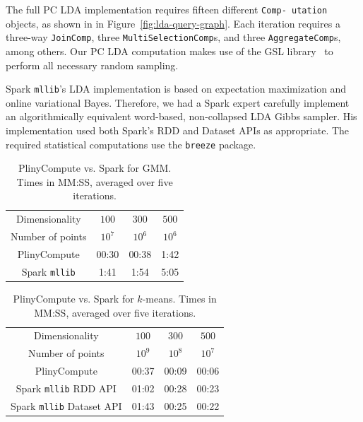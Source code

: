 The full PC LDA implementation requires fifteen different
\texttt{Comp- utation} objects, as shown in 
in Figure~\ref{fig:lda-query-graph}.  Each iteration requires a 
three-way \texttt{JoinComp}, three \texttt{MultiSelectionComp}s, and three
\texttt{AggregateComp}s, among others. 
Our PC LDA computation makes use of the GSL library~\cite{gsl} to perform all necessary random sampling.

Spark \texttt{mllib}'s LDA implementation is based on expectation
maximization and online variational Bayes.
Therefore, we had a Spark expert 
carefully implement an algorithmically
equivalent word-based, non-collapsed LDA Gibbs sampler.  His implementation used both
Spark's RDD and Dataset        
APIs as appropriate.
The required statistical computations use the
\texttt{breeze} package. 


\begin{table}[t]
\small
\begin{center}
\begin{tabular}{|c||c|c|c|}
\hline
Dimensionality & $100$ & $300$ & $500$ \\
Number of points & $10^7$ & $10^6$ & $10^6$ \\
\hline
\hline
PlinyCompute &00:30 & 00:38 & 1:42 \\
Spark \texttt{mllib} &1:41  &1:54 &5:05 \\
\hline
\end{tabular}
\caption{PlinyCompute vs. Spark for GMM. Times in MM:SS, averaged over five iterations.}
\label{fig:Gmm}
\end{center}
\vspace{-20pt}
\end{table}

\begin{table}[t]
\small
\begin{center}
\begin{tabular}{|c||c|c|c|}
\hline
Dimensionality & $100$ & $300$ & $500$ \\
Number of points & $10^9$ & $10^8$ & $10^7$ \\
\hline
\hline
PlinyCompute &00:37 & 00:09 & 00:06 \\
Spark \texttt{mllib} RDD API &01:02 & 00:28 & 00:23 \\
Spark \texttt{mllib} Dataset API&01:43 & 00:25 & 00:22 \\
\hline
\end{tabular}
\caption{PlinyCompute vs. Spark for $k$-means. Times in MM:SS, averaged over five iterations.}
\label{fig:KMeans}
\end{center}
\vspace{-20pt}
\end{table}

